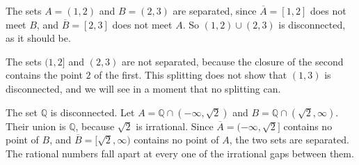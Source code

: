 \begin{marginfigure}
\centering
{}
\caption{In the upper picture $A = (1,2)$ and $B = (2,3)$ are separated, and the missing point $2$ keeps them apart.  In the lower picture $A = (1,2]$ and $B = (2,3)$ are disjoint but not separated, because $2 \in A$ is a limit point of $B$.}
\end{marginfigure}

\begin{example}
The sets $A = (1,2)$ and $B = (2,3)$ are separated, since $\overline{A} = [1,2]$ does not meet $B$, and $\overline{B} = [2,3]$ does not meet $A$.  So $(1,2) \cup (2,3)$ is disconnected, as it should be.

The sets $(1,2]$ and $(2,3)$ are not separated, because the closure of the second contains the point $2$ of the first.  This splitting does not show that $(1,3)$ is disconnected, and we will see in a moment that no splitting can.
\end{example}

\begin{example}
The set $\mathbb{Q}$ is disconnected.  Let $A = \mathbb{Q} \cap (-\infty, \sqrt2)$ and $B = \mathbb{Q} \cap (\sqrt2, \infty)$.  Their union is $\mathbb{Q}$, because $\sqrt2$ is irrational.  Since $\overline{A} = (-\infty, \sqrt2]$ contains no point of $B$, and $\overline{B} = [\sqrt2, \infty)$ contains no point of $A$, the two sets are separated.  The rational numbers fall apart at every one of the irrational gaps between them.
\end{example}

